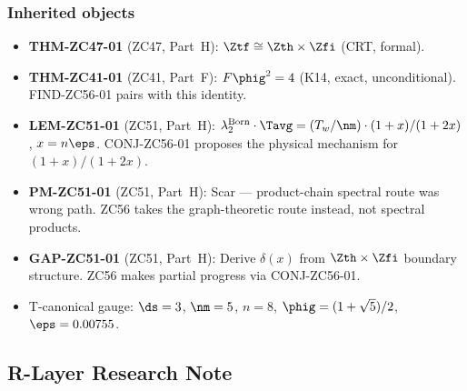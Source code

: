 \documentclass[12pt, a4paper]{article}
\begin{document}
\subsubsection{Inherited objects}

\begin{itemize}[leftmargin=2em, noitemsep]
\item \textbf{THM-ZC47-01} (ZC47, Part~H):
  $\Ztf\cong\Zth\times\Zfi$ (CRT, formal).
\item \textbf{THM-ZC41-01} (ZC41, Part~F):
  $F\phig^2=4$ (K14, exact, unconditional).
  FIND-ZC56-01 pairs with this identity.
\item \textbf{LEM-ZC51-01} (ZC51, Part~H):
  $\lambda_2^{\rm Born}\cdot\Tavg = (T_w/\nm)\cdot(1+x)/(1+2x)$,
  $x=n\eps$.
  CONJ-ZC56-01 proposes the physical mechanism for $(1+x)/(1+2x)$.
\item \textbf{PM-ZC51-01} (ZC51, Part~H):
  Scar --- product-chain spectral route was wrong path.
  ZC56 takes the graph-theoretic route instead, not spectral products.
\item \textbf{GAP-ZC51-01} (ZC51, Part~H):
  Derive $\delta(x)$ from $\Zth\times\Zfi$ boundary structure.
  ZC56 makes partial progress via CONJ-ZC56-01.
\item T-canonical gauge: $\ds=3$, $\nm=5$, $n=8$,
  $\phig=(1+\sqrt{5})/2$, $\eps=0.00755$.
\end{itemize}

\subsection{R-Layer Research Note}
\end{document}
